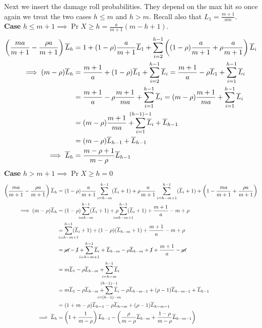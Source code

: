 Next we insert the damage roll probabilities. They depend on the max hit so once again we treat the two cases $h \leq m$ and $h>m$. Recall also that $L_1 = \frac{m+1}{am}$.\\
\textbf{Case} $h \leq m+1 \implies \Pr{X \geq h} = \frac{a}{m+1}(m-h+1)$.
\begin{align}
    \left(\frac{ma}{m+1} - \frac{\rho a}{m+1}\right)\L_h
	&= 1 + (1-\rho)\frac{a}{m+1}\L_1
	+ \sum_{i=2}^{h-1}\left((1-\rho)\frac{a}{m+1} + \rho\frac{a}{m+1}\right)\L_i\nonumber\\
    \implies (m - \rho)\L_h
	&= \frac{m+1}{a} + (1-\rho)\L_1 + \sum_{i=2}^{h-1} \L_i\nonumber
	= \frac{m+1}{a} - \rho\L_1 + \sum_{i=1}^{h-1} \L_i\nonumber\\
	&= \frac{m+1}{a} - \rho\frac{m+1}{ma} + \sum_{i=1}^{h-1} \L_i\nonumber
	= (m-\rho)\frac{m+1}{ma} + \sum_{i=1}^{h-1} \L_i\nonumber\\
	&= (m-\rho)\frac{m+1}{ma} + \sum_{i=1}^{\mathclap{(h-1)-1}} \L_i + \L_{h-1} \nonumber\\
    &= (m-\rho)\L_{h-1} + \L_{h-1} \nonumber\\
    \implies \L_h &= \frac{m-\rho+1}{m-\rho}\L_{h-1}
\end{align}
\textbf{Case} $h > m+1 \implies \Pr{X \geq h} = 0$
\begin{align}
    \left(\frac{ma}{m+1} - \frac{\rho a}{m+1}\right)\L_h
&= (1-\rho)\frac{a}{m+1}\sum_{i=h-m}^{h-1} (\L_i+1) + \rho\frac{a}{m+1}\sum_{i=h-m+1}^{h-1} (\L_i+1) + \left( 1 - \frac{ma}{m+1} + \frac{\rho a}{m+1}\right)\nonumber\\
    \implies (m-\rho)\L_h
    &= (1-\rho)\sum_{\mathclap{i=h-m}}^{h-1} (\L_i+1) + \rho\sum_{\mathclap{i=h-m+1}}^{h-1} (\L_i+1) + \frac{m+1}{a} - m + \rho\nonumber\\
    &= \sum_{\mathclap{i=h-m+1}}^{h-1} (\L_i+1) + (1-\rho)(\L_{h-m}+1) + \frac{m+1}{a} - m + \rho\nonumber\\
    &= \cancel{m} -\cancel{1} + \sum_{\mathclap{i=h-m+1}}^{h-1} \L_i + \L_{h-m} - \rho\L_{h-m} +\cancel{1} + \frac{m+1}{a} - \cancel{m}\nonumber\\
    &= m\L_1 - \rho\L_{h-m} + \sum_{\mathclap{i=h-m}}^{h-1} \L_i\nonumber\\
    &= m\L_1 - \rho\L_{h-m} + \sum_{\mathclap{i=(h-1)-m}}^{\mathclap{(h-1)-1}} \L_i - \rho\L_{h-m-1} + (\rho-1)\L_{h-m-1} + \L_{h-1}\nonumber\\
    &= (1 + m-\rho)\L_{h-1} - \rho\L_{h-m} + (\rho-1)\L_{h-m-1}\nonumber\\
    \implies \L_h &= \left(1 + \frac{1}{m-\rho}\right)\L_{h-1} - \left(\frac{\rho}{m-\rho}\L_{h-m} + \frac{1-\rho}{m-\rho}\L_{h-m-1}\right)\nonumber\\
\end{align}

